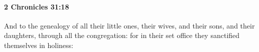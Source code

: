 
		\paragraph{2 Chronicles 31:18} %
			\label{2CHRONICLES-31-18}

			And to the genealogy of all their little ones, their wives, and their sons, and their daughters, through all the congregation: for in their set office they sanctified themselves in holiness:


